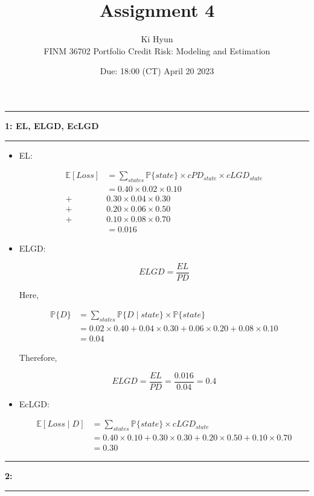 \documentclass[11pt]{article}
\newcommand\question[2]{\vspace{.25in}\hrule\textbf{#1: #2}\vspace{.5em}\hrule\vspace{.10in}}
\renewcommand\part[1]{\vspace{.10in}\textbf{(#1)}}
\newcommand{\Exp}{\mathbb{E}}
\renewcommand{\P}{\mathbb{P}}
\begin{document}
\raggedright


\newcommand\NAME{Ki Hyun}  %
\newcommand\ClassNumber{FINM 36702}
\newcommand\ClassName{Portfolio Credit Risk: Modeling and Estimation}    
\newcommand\ANUM{4}              %
\newcommand\duedate{18:00 (CT) April 20 2023}	%

\title{Assignment \ANUM}
\author{\NAME \\ 
\ClassNumber \text{:} \ClassName}
\date{Due: \duedate}

\maketitle


\question{1}{EL, ELGD, EcLGD}

\begin{itemize}

\item EL:

$$
\begin{aligned}
\Exp[Loss] &= \sum_{states} \P\{state\} 
\times cPD_{state} \times cLGD_{state} \\
&= 0.40 \times 0.02 \times 0.10 \\
+& 0.30 \times 0.04 \times 0.30 \\
+& 0.20 \times 0.06 \times 0.50 \\
+& 0.10 \times 0.08 \times 0.70 \\
&= 0.016 
\end{aligned}
$$

\item ELGD:

$$
ELGD = \frac{EL}{PD}
$$

Here,

$$
\begin{aligned}
\P\{D\} &= \sum_{states} \P\{D \mid state \} 
\times \P\{state\} \\
&= 0.02 \times 0.40 +
0.04 \times 0.30 +
0.06 \times 0.20 +
0.08 \times 0.10 \\
&= 0.04 
\end{aligned}
$$

Therefore,

$$
ELGD = \frac{EL}{PD}
= \frac{0.016}{0.04}
= 0.4
$$

\item EcLGD:

$$
\begin{aligned}
\Exp[Loss \mid D] &= \sum_{states} \P\{state\} 
\times cLGD_{state} \\
&= 0.40 \times 0.10 
+ 0.30 \times 0.30 
+ 0.20 \times 0.50 
+ 0.10 \times 0.70 \\
&= 0.30
\end{aligned}
$$

\end{itemize}

\newpage

\question{2}{}
\end{document}
